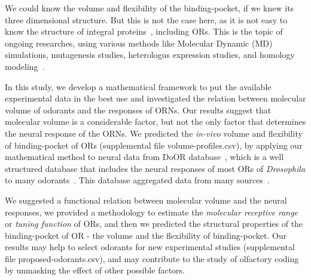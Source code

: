 \documentclass[fleqn,11pt]{wlscirep}
\begin{document}
We could know the volume and flexibility of the binding-pocket, 
if we knew its three dimensional structure. 
But this is not the case here, 
as it is not easy to know the structure of integral proteins~\cite{Zhang2008,Lupieri2009}, 
including ORs. 
This is the topic of ongoing researches, 
using various methods like Molecular Dynamic (MD) simulations, 
mutagenesis studies, heterologus expression studies, and homology modeling~\cite{Khafizov2007,Man2004,Lai2005,Vaidehi2002,Floriano2004,Schmiedeberg2007,Katada2005,Kato2008,Rospars2013}.

In this study, 
we develop a mathematical framework to put the available experimental data in the best use and
investigated the relation between molecular volume of odorants and the responses of ORNs. 
Our results suggest that molecular volume is a considerable factor, 
but not the only factor that determines the neural response of the ORNs.
We predicted the {\it in-vivo} volume and flexibility of binding-pocket of ORs (supplemental file volume-profiles.csv), 
by applying our mathematical method to neural data from DoOR database~\cite{Galizia2010}, 
which is a well structured database that includes the neural responses of most ORs of \textit{Drosophila} to many odorants~\cite{Galizia2010}. 
This database aggregated data from many sources~\cite{Bruyne1999,Bruyne2001,Dobritsa2003,Goldman2005,Hallem2004,Hallem2006,
Kreher2005,Kreher2008,Kwon2007,Pelz2006,Pelz2006,Schmuker2007,Stensmyr2003,
Turner2009,VanderGoesvanNaters2007,Yao2005}.

We suggested a functional relation between molecular volume and the neural responses, 
we provided a methodology to estimate the {\it molecular receptive range} or {\it tuning function} of ORs,
and then we predicted the structural properties of the binding-pocket of OR - the volume and the flexibility of binding-pocket.
Our results may help to select odorants  for new experimental studies (supplemental file proposed-odorants.csv), 
and may contribute to the study of olfactory coding by unmasking the effect of other possible factors.


\end{document}

